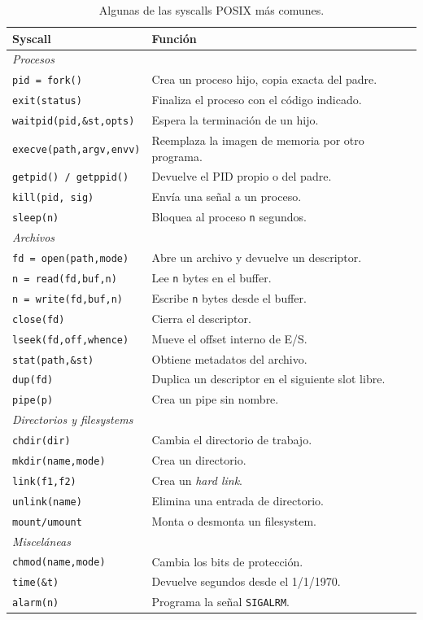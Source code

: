 \documentclass[11pt,a4paper]{article}
\begin{document}
\begin{table}[h]
\centering
\small
\begin{tabular}{p{4.5cm} p{9cm}}
\toprule
\textbf{Syscall} & \textbf{Función} \\
\midrule
\multicolumn{2}{l}{\emph{Procesos}} \\
\midrule
\texttt{pid = fork()} & Crea un proceso hijo, copia exacta del padre. \\
\texttt{exit(status)} & Finaliza el proceso con el código indicado. \\
\texttt{waitpid(pid,\&st,opts)} & Espera la terminación de un hijo. \\
\texttt{execve(path,argv,envv)} & Reemplaza la imagen de memoria por
otro programa. \\
\texttt{getpid() / getppid()} & Devuelve el PID propio o del padre. \\
\texttt{kill(pid, sig)} & Envía una señal a un proceso. \\
\texttt{sleep(n)} & Bloquea al proceso \texttt{n} segundos. \\
\midrule
\multicolumn{2}{l}{\emph{Archivos}} \\
\midrule
\texttt{fd = open(path,mode)} & Abre un archivo y devuelve un
descriptor. \\
\texttt{n = read(fd,buf,n)} & Lee \texttt{n} bytes en el buffer. \\
\texttt{n = write(fd,buf,n)} & Escribe \texttt{n} bytes desde el
buffer. \\
\texttt{close(fd)} & Cierra el descriptor. \\
\texttt{lseek(fd,off,whence)} & Mueve el offset interno de E/S. \\
\texttt{stat(path,\&st)} & Obtiene metadatos del archivo. \\
\texttt{dup(fd)} & Duplica un descriptor en el siguiente slot libre. \\
\texttt{pipe(p)} & Crea un pipe sin nombre. \\
\midrule
\multicolumn{2}{l}{\emph{Directorios y filesystems}} \\
\midrule
\texttt{chdir(dir)} & Cambia el directorio de trabajo. \\
\texttt{mkdir(name,mode)} & Crea un directorio. \\
\texttt{link(f1,f2)} & Crea un \emph{hard link}. \\
\texttt{unlink(name)} & Elimina una entrada de directorio. \\
\texttt{mount/umount} & Monta o desmonta un filesystem. \\
\midrule
\multicolumn{2}{l}{\emph{Misceláneas}} \\
\midrule
\texttt{chmod(name,mode)} & Cambia los bits de protección. \\
\texttt{time(\&t)} & Devuelve segundos desde el 1/1/1970. \\
\texttt{alarm(n)} & Programa la señal \texttt{SIGALRM}. \\
\bottomrule
\end{tabular}
\caption{Algunas de las syscalls POSIX más comunes.}
\end{table}
\end{document}
